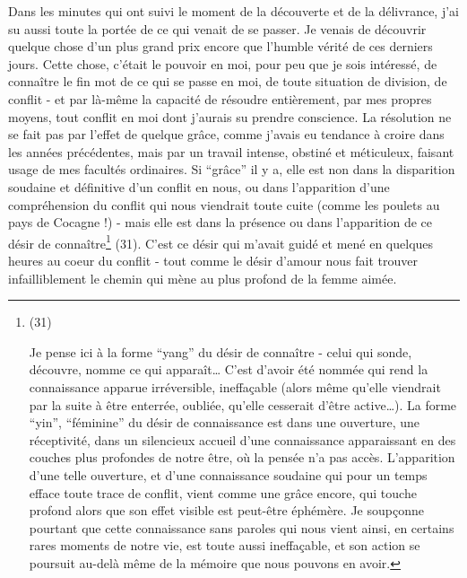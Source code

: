Dans les minutes qui ont suivi le moment de la découverte et de la délivrance, j'ai su aussi toute la portée de ce qui venait de se passer. Je venais de découvrir quelque chose d'un plus grand prix encore que l'humble vérité de ces derniers jours. Cette chose, c'était le pouvoir en moi, pour peu que je sois intéressé, de connaître le fin mot de ce qui se passe en moi, de toute situation de division, de conflit - et par là-même la capacité de résoudre entièrement, par mes propres moyens, tout conflit en moi dont j'aurais su prendre conscience. La résolution ne se fait pas par l'effet de quelque grâce, comme j'avais eu tendance à croire dans les années précédentes, mais par un travail intense, obstiné et méticuleux, faisant usage de mes facultés ordinaires. Si ``grâce'' il y a, elle est non dans la disparition soudaine et définitive d'un conflit en nous, ou dans l'apparition d'une compréhension du conflit qui nous viendrait toute cuite (comme les poulets au pays de Cocagne !) - mais elle est dans la présence ou dans l'apparition de ce désir de connaître\footnote{(31)\par Je pense ici à la forme ``yang'' du désir de connaître - celui qui sonde, découvre, nomme ce qui apparaît\ldots{} C'est d'avoir été nommée qui rend la connaissance apparue irréversible, ineffaçable (alors même qu'elle viendrait par la suite à être enterrée, oubliée, qu'elle cesserait d'être active\ldots{}). La forme ``yin'', ``féminine'' du désir de connaissance est dans une ouverture, une réceptivité, dans un silencieux accueil d'une connaissance apparaissant en des couches plus profondes de notre être, où la pensée n'a pas accès. L'apparition d'une telle ouverture, et d'une connaissance soudaine qui pour un temps efface toute trace de conflit, vient comme une grâce encore, qui touche profond alors que son effet visible est peut-être éphémère. Je soupçonne pourtant que cette connaissance sans paroles qui nous vient ainsi, en certains rares moments de notre vie, est toute aussi ineffaçable, et son action se poursuit au-delà même de la mémoire que nous pouvons en avoir.} (31). C'est ce désir qui m'avait guidé et mené en quelques heures au coeur du conflit - tout comme le désir d'amour nous fait trouver infailliblement le chemin qui mène au plus profond de la femme aimée.


